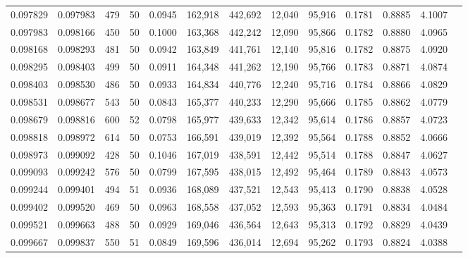 \begin{tabular}{rrrrrrrrrrrrr}
0.097829 & 0.097983 &   479 &  50 &                                     0.0945 & 162,918 & 442,692 &  12,040 &  95,916 & 0.1781 & 0.8885 & 4.1007 \\
0.097983 & 0.098166 &   450 &  50 &                                     0.1000 & 163,368 & 442,242 &  12,090 &  95,866 & 0.1782 & 0.8880 & 4.0965 \\
0.098168 & 0.098293 &   481 &  50 &                                     0.0942 & 163,849 & 441,761 &  12,140 &  95,816 & 0.1782 & 0.8875 & 4.0920 \\
0.098295 & 0.098403 &   499 &  50 &                                     0.0911 & 164,348 & 441,262 &  12,190 &  95,766 & 0.1783 & 0.8871 & 4.0874 \\
0.098403 & 0.098530 &   486 &  50 &                                     0.0933 & 164,834 & 440,776 &  12,240 &  95,716 & 0.1784 & 0.8866 & 4.0829 \\
0.098531 & 0.098677 &   543 &  50 &                                     0.0843 & 165,377 & 440,233 &  12,290 &  95,666 & 0.1785 & 0.8862 & 4.0779 \\
0.098679 & 0.098816 &   600 &  52 &                                     0.0798 & 165,977 & 439,633 &  12,342 &  95,614 & 0.1786 & 0.8857 & 4.0723 \\
0.098818 & 0.098972 &   614 &  50 &                                     0.0753 & 166,591 & 439,019 &  12,392 &  95,564 & 0.1788 & 0.8852 & 4.0666 \\
0.098973 & 0.099092 &   428 &  50 &                                     0.1046 & 167,019 & 438,591 &  12,442 &  95,514 & 0.1788 & 0.8847 & 4.0627 \\
0.099093 & 0.099242 &   576 &  50 &                                     0.0799 & 167,595 & 438,015 &  12,492 &  95,464 & 0.1789 & 0.8843 & 4.0573 \\
0.099244 & 0.099401 &   494 &  51 &                                     0.0936 & 168,089 & 437,521 &  12,543 &  95,413 & 0.1790 & 0.8838 & 4.0528 \\
0.099402 & 0.099520 &   469 &  50 &                                     0.0963 & 168,558 & 437,052 &  12,593 &  95,363 & 0.1791 & 0.8834 & 4.0484 \\
0.099521 & 0.099663 &   488 &  50 &                                     0.0929 & 169,046 & 436,564 &  12,643 &  95,313 & 0.1792 & 0.8829 & 4.0439 \\
0.099667 & 0.099837 &   550 &  51 &                                     0.0849 & 169,596 & 436,014 &  12,694 &  95,262 & 0.1793 & 0.8824 & 4.0388 \\

\end{tabular}
